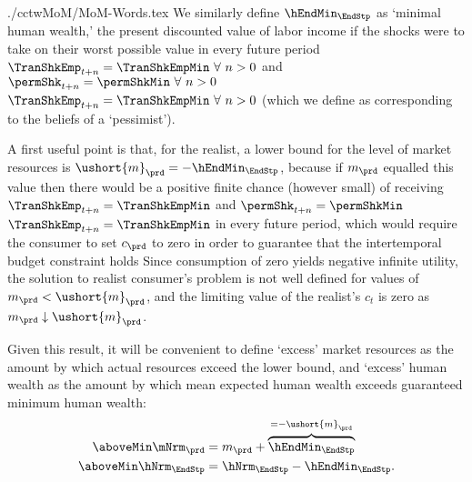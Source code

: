 \documentclass[\econtexRoot/SolvingMicroDSOPs]{subfiles}
\begin{document}
\begin{verbatimwrite}{./cctwMoM/MoM-Words.tex}
  We similarly define $\hEndMin_{\EndStp}$ as `minimal human wealth,' the
  present discounted value of labor income if the shocks were to take on
  their worst possible value in every future period \permShkOn
  {$\TranShkEmp_{t+n} = \TranShkEmpMin ~\forall~n>0$ and $\permShk_{t+n} =
    \permShkMin ~\forall~n>0$} {$\TranShkEmp_{t+n} = \TranShkEmpMin
    ~\forall~n>0$} (which we define as corresponding to the beliefs of a
  `pessimist').


  A first useful point is that, for the realist, a lower bound for the
  level of market resources is $\ushort{m}_{\prd} = -\hEndMin_{\EndStp}$, because
  if ${m}_{\prd}$ equalled this value then there would be a positive finite
  chance (however small) of receiving \permShkOn
  {$\TranShkEmp_{t+n}=\TranShkEmpMin$ and $\permShk_{t+n}=\permShkMin$}
  {$\TranShkEmp_{t+n}=\TranShkEmpMin$}
  in
  every future period, which would require the consumer to set ${c}_{\prd}$
  to zero in order to guarantee that the intertemporal budget constraint
  holds  Since consumption of zero yields negative
  infinite utility, the solution to realist consumer's problem is not well
  defined for values of ${m}_{\prd} < \ushort{m}_{\prd}$, and the limiting
  value of the realist's ${c}_t$ is zero as ${m}_{\prd} \downarrow \ushort{m}_{\prd}$.

  Given this result, it will be convenient to define `excess' market
  resources as the amount by which actual resources exceed the lower
  bound, and `excess' human wealth as the amount by which mean expected human wealth
  exceeds guaranteed minimum human wealth:
  \begin{equation*}\begin{gathered}\begin{aligned}
        \aboveMin \mNrm_{\prd}  & = {m}_{\prd}+\overbrace{\hEndMin_{\EndStp}}^{=-\ushort{m}_{\prd}}
        \\  \aboveMin \hNrm_{\EndStp}  & = \hNrm_{\EndStp}-\hEndMin_{\EndStp}.
      \end{aligned}\end{gathered}\end{equation*}


\end{verbatimwrite}
\end{document}
